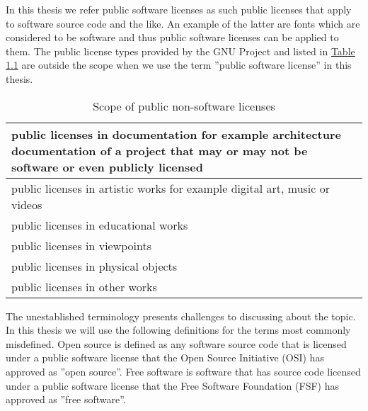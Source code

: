 In this thesis we refer public software licenses as such public licenses that apply to software source code and the like. An example of the latter are fonts which are considered to be software and thus public software licenses can be applied to them. The public license types provided by the GNU Project \citep{gnu:licenselist} and listed in \hyperref[table:non-software-licenses]{Table 1.1} are outside the scope when we use the term ''public software license'' in this thesis.
\begin{table}[t]
  \begin{center}
    \begin{tabular}{ |m{25em}| } 
      \hline
      public licenses in documentation for example architecture documentation of a project that may or may not be software or even publicly licensed \\
      \hline
      public licenses in artistic works for example digital art, music or videos \\
      \hline
      public licenses in educational works \\
      \hline
      public licenses in viewpoints \\
      \hline
      public licenses in physical objects \\
      \hline
      public licenses in other works \\
      \hline
    \end{tabular}
  \caption{Scope of public non-software licenses}
  \label{table:non-software-licenses}
  \end{center}
\end{table}

The unestablished terminology presents challenges to discussing about the topic. In this thesis we will use the following definitions for the terms most commonly misdefined. Open source is defined as any software source code that is licensed under a public software license that the Open Source Initiative (OSI) has approved as ''open source''. Free software is software that has source code licensed under a public software license that the Free Software Foundation (FSF) has approved as ''free software''.

